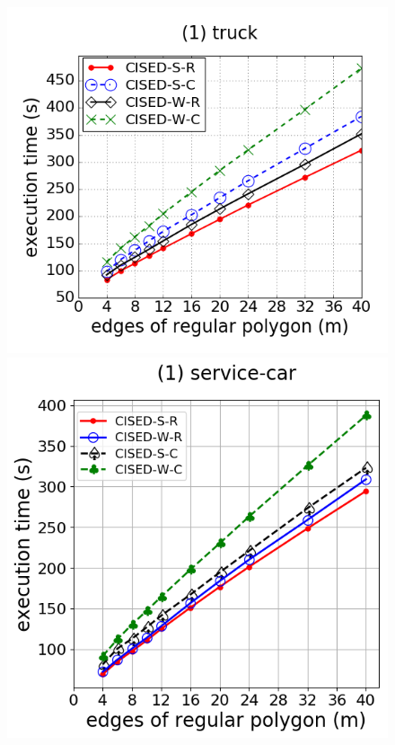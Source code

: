 \begin{figure}[tb!]
\centering
\includegraphics[scale = 0.250]{figures/Exp-M-e-60-time-truck.png}
\includegraphics[scale = 0.250]{figures/Exp-M-e-60-time-service.png}

\end{figure}
